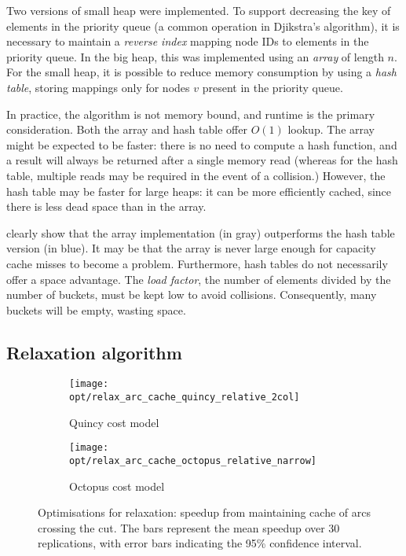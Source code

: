 Two versions of small heap were implemented. To support decreasing the key of elements in the priority queue (a common operation in Djikstra's algorithm), it is necessary to maintain a \emph{reverse index} mapping node IDs to elements in the priority queue. In the big heap, this was implemented using an \emph{array} of length $n$. For the small heap, it is possible to reduce memory consumption by using a \emph{hash table}, storing mappings only for nodes $v$ present in the priority queue.

In practice, the algorithm is not memory bound, and runtime is the primary consideration. Both the array and hash table offer $O(1)$ lookup. The array might be expected to be faster: there is no need to compute a hash function, and a result will always be returned after a single memory read (whereas for the hash table, multiple reads may be required in the event of a collision.) However, the hash table may be faster for large heaps: it can be more efficiently cached, since there is less dead space than in the array.

 clearly show that the array implementation (in gray) outperforms the hash table version (in blue). It may be that the array is never large enough for capacity cache misses to become a problem. Furthermore, hash tables do not necessarily offer a space advantage. The \emph{load factor}, the number of elements divided by the number of buckets, must be kept low to avoid collisions. Consequently, many buckets will be empty, wasting space.


\subsection{Relaxation algorithm}

\begin{figure}
    \centering
    \begin{subfigure}[c]{0.49\textwidth}
        \texttt{[image: opt/relax\_arc\_cache\_quincy\_relative\_2col]}
        \caption{Quincy cost model}
    \end{subfigure}
    \begin{subfigure}[c]{0.49\textwidth}
        \texttt{[image: opt/relax\_arc\_cache\_octopus\_relative\_narrow]}
        \caption{Octopus cost model}
    \end{subfigure}
    \caption[Optimisations for relaxation]{Optimisations for relaxation: speedup from maintaining cache of arcs crossing the cut. The bars represent the mean speedup over 30 replications, with error bars indicating the 95\% confidence interval.}
    \label{fig:opt-relax-cache-arcs}
\end{figure}

